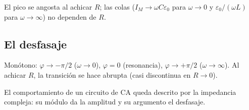 \documentclass[12pt,a4paper]{article}
\begin{document}
El pico se angosta al achicar $R$; las colas ($I_M \to \omega C\varepsilon_0$
para $\omega\to 0$ y $\varepsilon_0/(\omega L)$ para $\omega\to\infty$) no
dependen de $R$.



\subsection{El desfasaje}

Monótono: $\varphi \to -\pi/2$ ($\omega\to 0$), $\varphi = 0$ (resonancia),
$\varphi \to +\pi/2$ ($\omega\to\infty$). Al achicar $R$, la transición se hace
abrupta (casi discontinua en $R\to 0$).



\begin{notebox}[Cierre]
  El comportamiento de un circuito de CA queda descrito por la impedancia
  compleja: su módulo da la amplitud y su argumento el desfasaje.
\end{notebox}
\end{document}
